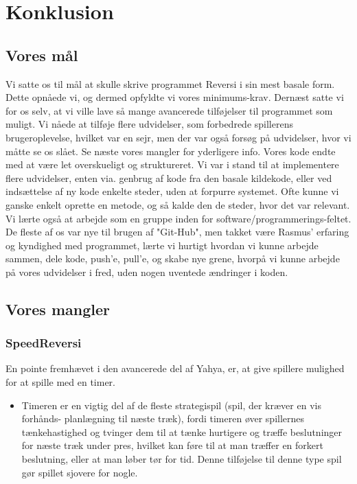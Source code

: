 \section{Konklusion}

\subsection{Vores mål}\label{VM}
Vi satte os til mål at skulle skrive programmet Reversi i sin mest basale form. Dette opnåede vi, og dermed opfyldte vi vores minimums-krav. Dernæst satte vi for os selv, at vi ville lave så mange avancerede tilføjelser til programmet som muligt. Vi nåede at tilføje flere udvidelser, som forbedrede spillerens brugeroplevelse, hvilket var en sejr, men der var også forsøg på udvidelser, hvor vi måtte se os slået. Se næste {vores mangler} for yderligere info. 
Vores kode endte med at være let overskueligt og struktureret. Vi var i stand til at implementere flere udvidelser, enten via. genbrug af kode fra den basale kildekode, eller ved indsættelse af ny kode enkelte steder, uden at forpurre systemet. Ofte kunne vi ganske enkelt oprette en metode, og så kalde den de steder, hvor det var relevant. 
Vi lærte også at arbejde som en gruppe inden for software/programmerings-feltet. De fleste af os var nye til brugen af "Git-Hub", men takket være Rasmus' erfaring og kyndighed med programmet, lærte vi hurtigt hvordan vi kunne arbejde sammen, dele kode, push'e, pull'e, og skabe nye grene, hvorpå vi kunne arbejde på vores udvidelser i fred, uden nogen uventede ændringer i koden. 


\subsection{Vores mangler}
\subsubsection{SpeedReversi}\label{SR}
En pointe fremhævet i den avancerede del af Yahya, er, at give spillere mulighed for at spille med en timer.
\begin{itemize}
\item Timeren er en vigtig del af de fleste strategispil (spil, der kræver en vis forhånds- planlægning til næste træk), fordi timeren øver spillernes tænkehastighed og tvinger dem til at tænke hurtigere og træffe beslutninger for næste træk under pres, hvilket kan føre til at man træffer en forkert beslutning, eller at man løber tør for tid. Denne tilføjelse til denne type spil gør spillet sjovere for nogle. 
\end{itemize}


